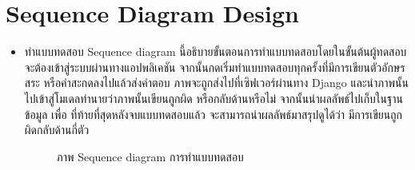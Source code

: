 \documentclass[12pt,oneside,openright,a4paper]{cpe-thai-project}
\begin{document}
\section{Sequence Diagram Design}
   \begin{itemize}
    \item ทำแบบทดสอบ 
    Sequence diagram นี้อธิบายขั้นตอนการทำแบบทดสอบโดยในขั้นต้นผู้ทดสอบจะต้องเข้าสู่ระบบผ่านทางแอปพลิเคชัน 
    จากนั้นกดเริ่มทำแบบทดสอบทุกครั้งที่มีการเขียนตัวอักษร สระ หรือคำสะกดลงไปแล้วส่งคำตอบ ภาพจะถูกส่งไปที่เซิฟเวอร์ผ่านทาง Django และนำภาพนั้นไปเข้าสู่โมเดลทำนายว่าภาพนั้นเขียนถูกผิด หรือกลับด้านหรือไม่ จากนั้นนำผลลัพธ์ไปเก็บในฐานข้อมูล เพื่อ ที่ท้ายที่สุดหลังจบแบบทดสอบแล้ว 
     จะสามารถนำผลลัพธ์มาสรุปดูได้ว่า มีการเขียนถูกผิดกลับด้านกี่ตัว 
    \begin{figure}[!ht]\centering
      \setlength{\fboxrule}{0.2mm} %
      \setlength{\fboxsep}{1cm}
      \caption{ภาพ Sequence diagram การทำแบบทดสอบ}\label{fig:activity1}
     \end{figure}
     \newpage
     \begin{table}[!h]\centering

\end{table}
\end{itemize}
\end{document}
